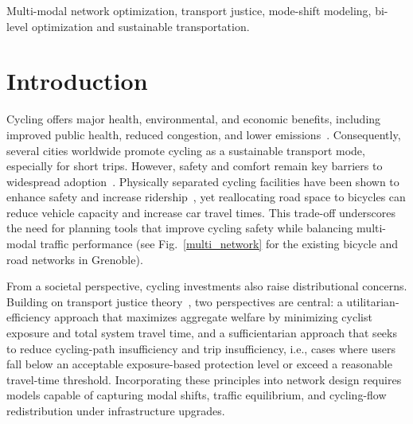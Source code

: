 \documentclass[lettersize,journal]{IEEEtran}
\begin{document}
\begin{abstract}


\end{abstract}

\begin{IEEEkeywords}
Multi-modal network optimization, transport justice, mode-shift modeling, bi-level optimization and sustainable transportation.
\end{IEEEkeywords}

\section{Introduction}
Cycling offers major health, environmental, and economic benefits, including improved public health, reduced congestion, and lower emissions~\cite{garrard2012health, gotschi2016cycling}.
Consequently, several cities worldwide promote cycling as a sustainable transport mode, especially for short trips.
However, safety and comfort remain key barriers to widespread adoption~\cite{fishman2012barriers}.
Physically separated cycling facilities have been shown to enhance safety and increase ridership~\cite{lawrence2018cyclist, pucher2011walking}, yet reallocating road space to bicycles can reduce vehicle capacity and increase car travel times.
This trade-off underscores the need for planning tools that improve cycling safety while balancing multi-modal traffic performance (see Fig.~\ref{multi_network} for
the existing bicycle and road networks in Grenoble).

From a societal perspective, cycling investments also raise distributional concerns. Building on transport justice theory~\cite{martens2017transport}, two perspectives are central: a utilitarian-efficiency approach that maximizes aggregate welfare by minimizing cyclist exposure and total system travel time, and a sufficientarian approach that seeks to reduce cycling-path insufficiency and trip insufficiency, i.e., cases where users fall below an acceptable exposure-based protection level or exceed a reasonable travel-time threshold. Incorporating these principles into network design requires models capable of capturing modal shifts, traffic equilibrium, and cycling-flow redistribution under infrastructure upgrades.
\end{document}
